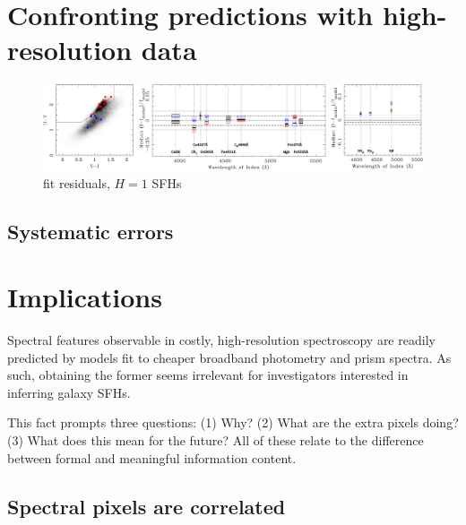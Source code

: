 \documentclass[a4paper,fleqn,usenatbib]{mnras}
\begin{document}

\section{Confronting predictions with high-resolution data}
\label{sec:results}

\begin{figure}
\includegraphics[width = \textwidth]{residuals}
\caption{fit residuals, $H=1$ SFHs}
\label{fig:resids}
\end{figure}

\subsection{Systematic errors}
\label{sec:systematics}



\section{Implications}
\label{sec:discussion}

Spectral features observable in costly, high-resolution spectroscopy are readily predicted by 
models fit to cheaper broadband photometry and prism spectra. As such, obtaining the former 
seems irrelevant for investigators interested in inferring galaxy SFHs.

This fact prompts three questions: (1) Why? (2) What are the extra pixels doing? (3) What does
this mean for the future? All of these relate to the difference between formal and meaningful 
information content.

\subsection{Spectral pixels are correlated}
\label{sec:pixels}
\end{document}
